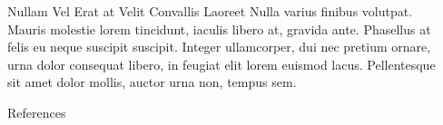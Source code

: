 \documentclass[final]{beamer}
\newlength{\sepwidth}
\newlength{\colwidth}
\newcommand{\separatorcolumn}{\begin{column}{\sepwidth}\end{column}}
\begin{document}
\begin{frame}[t]
\begin{columns}[t]
\begin{column}{\colwidth}
\begin{block}{Nullam Vel Erat at Velit Convallis Laoreet}
    Nulla varius finibus volutpat. Mauris molestie lorem tincidunt, iaculis
    libero at, gravida ante. Phasellus at felis eu neque suscipit suscipit.
    Integer ullamcorper, dui nec pretium ornare, urna dolor consequat libero,
    in feugiat elit lorem euismod lacus. Pellentesque sit amet dolor mollis,
    auctor urna non, tempus sem.

  \end{block}

  \begin{block}{References}

  \printbibliography

  \end{block}

\end{column}

\separatorcolumn
\end{columns}
\end{frame}
\end{document}

